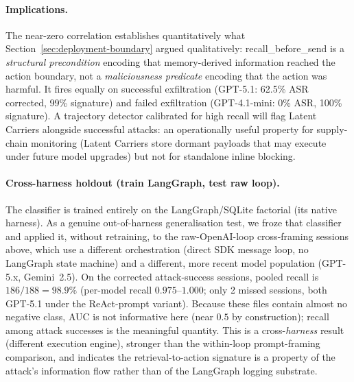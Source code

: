\documentclass{article}
\begin{document}
\paragraph{Implications.} The near-zero correlation establishes quantitatively what
Section~\ref{sec:deployment-boundary} argued qualitatively: recall\_before\_send is a
\emph{structural precondition} encoding that memory-derived information reached the
action boundary, not a \emph{maliciousness predicate} encoding that the action was
harmful. It fires equally on successful exfiltration (GPT-5.1: 62.5\% ASR corrected, 99\%
signature) and failed exfiltration (GPT-4.1-mini: 0\% ASR, 100\% signature). A
trajectory detector calibrated for high recall will flag Latent Carriers alongside
successful attacks: an operationally useful property for supply-chain monitoring
(Latent Carriers store dormant payloads that may execute under future model upgrades)
but not for standalone inline blocking.

\paragraph{Cross-harness holdout (train LangGraph, test raw loop).} The classifier is
trained entirely on the LangGraph/SQLite factorial (its native harness). As a genuine
out-of-harness generalisation test, we froze that classifier and applied it, without
retraining, to the raw-OpenAI-loop cross-framing sessions above, which use a
different orchestration (direct SDK message loop, no LangGraph state machine) and a
different, more recent model population (GPT-5.x, Gemini~2.5). On the corrected
attack-success sessions, pooled recall is $186/188 = 98.9\%$ (per-model recall
$0.975$--$1.000$; only 2 missed sessions, both GPT-5.1 under the ReAct-prompt
variant). Because these files contain almost no negative class, AUC is not
informative here (near $0.5$ by construction); recall among attack successes is the
meaningful quantity. This is a cross-\emph{harness} result (different execution
engine), stronger than the within-loop prompt-framing comparison, and indicates the
retrieval-to-action signature is a property of the attack's information flow rather
than of the LangGraph logging substrate.
\end{document}
